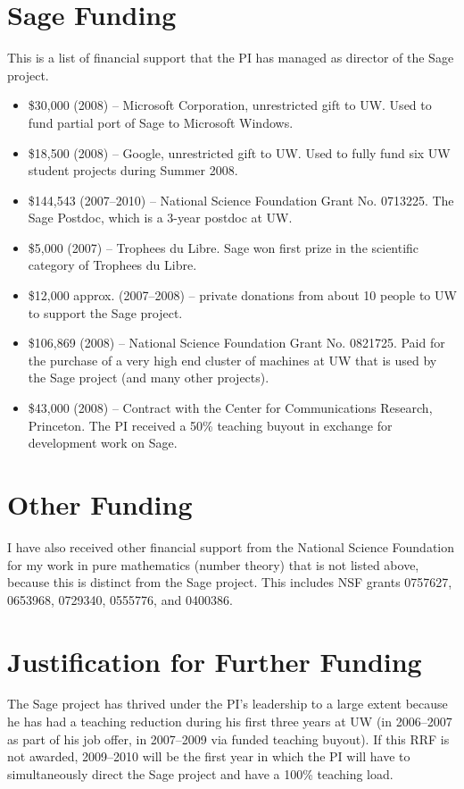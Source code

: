\documentclass[11pt]{article}
\begin{document}
\mbox{}

\section{Sage Funding}

\noindent{}This is a list of financial support that the PI has
managed  as director of the Sage project.

\begin{itemize}\setlength{\itemsep}{0ex}

\item \$30,000 (2008) -- Microsoft Corporation, unrestricted gift to UW.  Used to fund
partial port of Sage to Microsoft Windows.
\item \$18,500 (2008) -- Google, unrestricted gift to UW.  Used to fully fund six
  UW student projects during Summer 2008.
\item \$144,543 (2007--2010) -- National Science Foundation Grant No. 0713225. 
  The Sage Postdoc, which is a 3-year postdoc at UW.
\item \$5,000 (2007) -- Trophees du Libre. Sage won first prize in the
  scientific category of Trophees du Libre.
\item \$12,000 approx. (2007--2008) -- private donations from about 10 people to UW
  to support the Sage project.
\item \$106,869 (2008) -- National Science Foundation Grant
  No. 0821725. Paid for the purchase of a very high end cluster of
  machines at UW that is used by the Sage project (and many other
  projects).
\item \$43,000 (2008) -- Contract with the Center for Communications
  Research, Princeton.  The PI received a 50\% teaching buyout in
  exchange for development work on Sage.
\end{itemize}

\section{Other Funding}
\noindent{}I have also received other financial support from the National Science
Foundation for my work in pure mathematics (number theory) that is not
listed above, because this is distinct from the Sage project.  This
includes NSF grants 0757627, 0653968, 0729340, 0555776, and 0400386.

\section{Justification for Further Funding}
The Sage project has thrived under the PI's leadership to a
large extent because he has had a teaching reduction during his first
three years at UW (in 2006--2007 as part of his job offer, in
2007--2009 via funded teaching buyout).  If this RRF is not awarded,
2009--2010 will be the first year in which the PI will have to
simultaneously direct the Sage project and have a 100\% teaching load.
\end{document}
